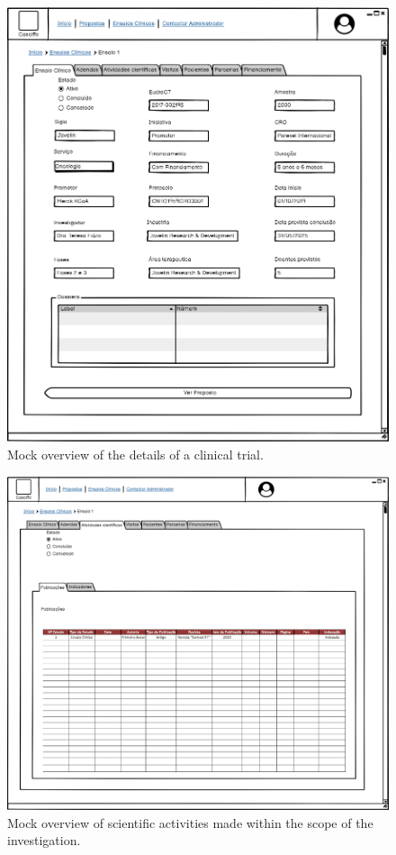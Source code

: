 \begin{figure}[H]
    \centering
    \includegraphics[scale=0.35]{images/ensaio-detalhe.png}
    \caption{Mock overview of the details of a clinical trial.}
    \label{fig:enasio-detalhe}
\end{figure}


\begin{figure}[H]
    \centering
    \includegraphics[scale=0.35]{images/ensaio-atividades-cientificas.png}
    \caption{Mock overview of scientific activities made within the scope of the investigation.}
    \label{fig:ensaio-atividades-cientificas}
\end{figure}


